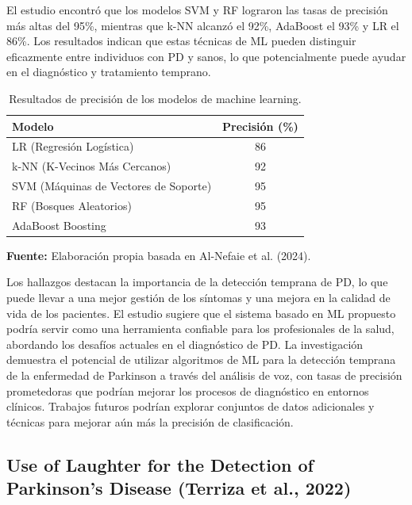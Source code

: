 \documentclass[listof=nochaptergap,12pt,times,authoryear]{report}
\begin{document}
El estudio encontró que los modelos SVM y RF lograron las tasas de precisión más altas del 95\%, mientras que k-NN alcanzó el 92\%, AdaBoost el 93\% y LR el 86\%. Los resultados indican que estas técnicas de ML pueden distinguir eficazmente entre individuos con PD y sanos, lo que potencialmente puede ayudar en el diagnóstico y tratamiento temprano.

\begin{table}[H]
\centering
\caption{Resultados de precisión de los modelos de machine learning.}
\label{tab:accuracy_results}
\begin{tabular}{|l|c|}
\hline
\textbf{Modelo} & \textbf{Precisión (\%)} \\ \hline
LR (Regresión Logística) & 86 \\ \hline
k-NN (K-Vecinos Más Cercanos) & 92 \\ \hline
SVM (Máquinas de Vectores de Soporte) & 95 \\ \hline
RF (Bosques Aleatorios) & 95 \\ \hline
AdaBoost Boosting & 93 \\ \hline
\end{tabular}
\begin{flushleft}
\footnotesize \textbf{Fuente:} Elaboración propia basada en Al-Nefaie et al. (2024).
\end{flushleft}
\end{table}



Los hallazgos destacan la importancia de la detección temprana de PD, lo que puede llevar a una mejor gestión de los síntomas y una mejora en la calidad de vida de los pacientes. El estudio sugiere que el sistema basado en ML propuesto podría servir como una herramienta confiable para los profesionales de la salud, abordando los desafíos actuales en el diagnóstico de PD.
La investigación demuestra el potencial de utilizar algoritmos de ML para la detección temprana de la enfermedad de Parkinson a través del análisis de voz, con tasas de precisión prometedoras que podrían mejorar los procesos de diagnóstico en entornos clínicos. Trabajos futuros podrían explorar conjuntos de datos adicionales y técnicas para mejorar aún más la precisión de clasificación.

\subsection{Use of Laughter for the Detection of Parkinson’s Disease (Terriza et al., 2022)}
\end{document}
